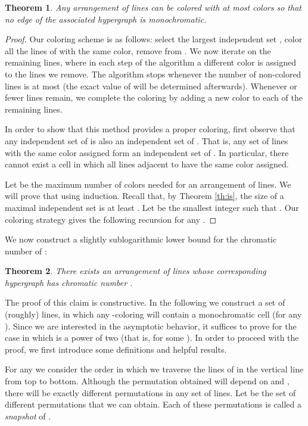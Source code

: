 \documentclass[11pt,a4paper]{article}
\newtheorem{theorem}{Theorem}
\begin{document}
\begin{theorem}\label{UB:chrom}
Any arrangement of  lines can be colored with at most  colors so that no edge of the associated  hypergraph is monochromatic.
\end{theorem}
\begin{proof}
Our coloring scheme is as follows: select the largest independent set , color all the lines of  with the same color, remove  from . We now iterate on the remaining lines, where in each step of the algorithm a different color is assigned to the lines we remove. The algorithm stops whenever the number of non-colored lines is at most  (the exact value of  will be determined afterwards). Whenever  or fewer lines remain, we complete the coloring by adding a new color to each of the remaining lines. 

In order to show that this method provides a proper coloring, first observe that any independent set of  is also an independent set of . That is, any set of lines with the same color assigned form an independent set of . In particular, there cannot exist a cell  in which all lines adjacent to  have the same color assigned.

Let  be the maximum number of colors needed for an arrangement of  lines. We will prove that  using induction. Recall that, by Theorem \ref{th:is}, the size of a maximal independent set is at least . Let  be the smallest integer such that . Our coloring strategy gives the following recursion for any . 


\end{proof}

We now construct a slightly sublogarithmic lower bound for the chromatic number of :

\begin{theorem}
\label{LB:chroma}
There exists an arrangement of  lines whose corresponding hypergraph   has chromatic number .
\end{theorem}
The proof of this claim is constructive. In the following we construct a set of (roughly)  lines, in which any -coloring will contain a monochromatic cell (for any ).  Since we are interested in the asymptotic behavior, it suffices to prove for the case in which  is a power of two (that is,  for some ). In order to proceed with the proof, we first introduce some definitions and helpful results.


For any  we consider the order in which we traverse the lines of  in the vertical line  from top to bottom. Although the permutation obtained will depend on  and , there will be exactly  different permutations in any set  of  lines. Let  be the set of different permutations that we can obtain. Each of these permutations is called a {\em snapshot} of .
\end{document}
